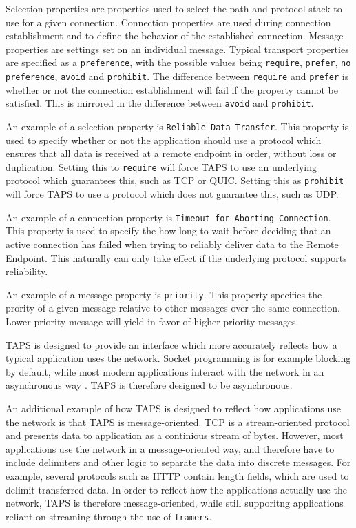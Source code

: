 Selection
properties are properties used to select the path and protocol stack
to use for a given connection. Connection properties are used
during connection establishment and to define the behavior of the
established connection. Message properties are settings set on an
individual message. Typical transport properties are specified as
a \texttt{preference}, with the possible values being \texttt{require},
\texttt{prefer}, \texttt{no preference}, \texttt{avoid} and \texttt{prohibit}.
The difference between \texttt{require} and \texttt{prefer} is whether
or not the connection establishment will fail if the property cannot
be satisfied. This is mirrored in the difference between \texttt{avoid}
and \texttt{prohibit}.

An example of a selection property is \texttt{Reliable Data Transfer}.
This property is used to specify whether or not the application
should use a protocol which ensures that all data is received at 
a remote endpoint in order, without loss or duplication. Setting
this to \texttt{require} will force TAPS to use an underlying protocol
which guarantees this, such as TCP or QUIC. Setting this as
\texttt{prohibit} will force TAPS to use a protocol which does not
guarantee this, such as UDP.

An example of a connection property is \texttt{Timeout for Aborting Connection}.
This property is used to specify the how long to wait before deciding that an
active connection has failed when trying to reliably deliver data to the Remote Endpoint.
This naturally can only take effect if the underlying protocol supports reliability.

An example of a message property is \texttt{priority}. This property specifies
the prority of a given message relative to other messages over the same connection.
Lower priority message will yield in favor of higher priority messages.

TAPS is designed to provide an interface which more accurately
reflects how a typical application uses the network. Socket programming
is for example blocking by default, while most modern applications
interact with the network in an asynchronous way 
\cite{trammellAbstractApplicationProgramming2025}. TAPS
is therefore designed to be asynchronous. 

An additional
example of how TAPS is designed to reflect how applications
use the network is that TAPS is message-oriented. TCP
is a stream-oriented protocol and presents data to application
as a continious stream of bytes. However, most applications
use the network in a message-oriented way, and therefore
have to include delimiters and other logic to separate the
data into discrete messages. For example, several protocols
such as HTTP contain length fields, which are used to delimit
transferred data. In order to reflect
how the applications actually use the network, TAPS is therefore
message-oriented, while still supporitng applications reliant on 
streaming through the use of \texttt{framers}.

